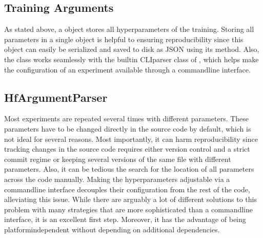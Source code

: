 \documentclass[letterpaper,10pt,english]{jupyterBook}
\begin{document}
\subsection{Training Arguments}
\label{\detokenize{HuggingFaceTrainer:training-arguments}}
\sphinxAtStartPar
As stated above, a  object stores all hyperparameters of the training.
Storing all parameters in a single object is helpful to ensuring reproducibility since this object can easily be serialized and saved to disk as JSON using its \sphinxhyphen{}method.
Also, the  class works seamlessly with the built\sphinxhyphen{}in CLI\sphinxhyphen{}parser class of , which helps make the configuration of an experiment available through a command\sphinxhyphen{}line interface.


\subsection{HfArgumentParser}
\label{\detokenize{HuggingFaceTrainer:hfargumentparser}}
\sphinxAtStartPar
Most experiments are repeated several times with different parameters. These parameters have to be changed directly in the source code by default, which is not ideal for several reasons.
Most importantly, it can harm reproducibility since tracking changes in the source code requires either version control and a strict commit regime or keeping several versions of the same file with different parameters. Also, it can be tedious the search for the location of all parameters across the code manually.
Making the hyperparameters adjustable via a command\sphinxhyphen{}line interface decouples their configuration from the rest of the code, alleviating this issue.
While there are arguably a lot of different solutions to this problem with many strategies that are more sophisticated than a command\sphinxhyphen{}line interface, it is an excellent first step.
Moreover, it has the advantage of being platform\sphinxhyphen{}independent without depending on additional dependencies.
\end{document}
